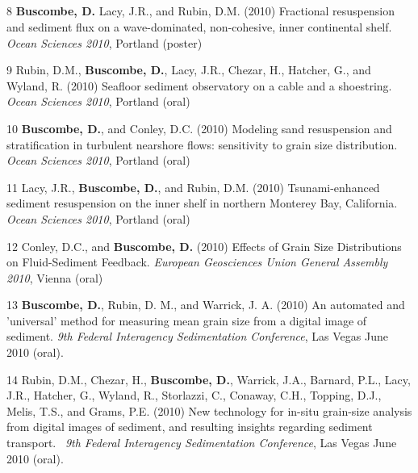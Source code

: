 \documentclass[margin,line]{resume}
\begin{document}
\begin{resume}
\begin{footnotesize}
	\subsection{}
	\begin{list1}
	\item[8] {\bf Buscombe, D.} Lacy, J.R., and Rubin, D.M. (2010) Fractional resuspension and sediment flux on a wave-dominated, non-cohesive, inner continental shelf. {\sl Ocean Sciences 2010}, Portland (poster)\\

	\item[9] Rubin, D.M., {\bf Buscombe, D.}, Lacy, J.R., Chezar, H., Hatcher, G., and Wyland, R. (2010) Seafloor sediment observatory on a cable and a shoestring. {\sl Ocean Sciences 2010}, Portland (oral)\\

	\item[10] {\bf Buscombe, D.}, and Conley, D.C. (2010) Modeling sand resuspension and stratification in turbulent nearshore flows: sensitivity to grain size distribution. {\sl Ocean Sciences 2010}, Portland (oral)\\

	\item[11] Lacy, J.R., {\bf Buscombe, D.}, and Rubin, D.M. (2010) Tsunami-enhanced sediment resuspension on the inner shelf in northern Monterey Bay, California. {\sl Ocean Sciences 2010}, Portland (oral)\\

	\item[12] Conley, D.C., and {\bf Buscombe, D.} (2010) Effects of Grain Size Distributions on Fluid-Sediment Feedback. {\sl European Geosciences Union General Assembly 2010}, Vienna (oral)\\

	\item[13] {\bf Buscombe, D.}, Rubin, D. M., and Warrick, J. A. (2010) An automated and 'universal' method for measuring mean grain size from a digital image of sediment. {\sl 9th Federal Interagency Sedimentation Conference}, Las Vegas June 2010 (oral).\\

	\item[14] Rubin, D.M., Chezar, H., {\bf Buscombe, D.}, Warrick, J.A., Barnard, P.L., Lacy, J.R., Hatcher, G., Wyland, R., Storlazzi, C., Conaway, C.H., Topping, D.J., Melis, T.S., and Grams, P.E. (2010) New technology for in-situ grain-size analysis from digital images of sediment, and resulting insights regarding sediment transport.  {\sl 9th Federal Interagency Sedimentation Conference}, Las Vegas June 2010 (oral).\\


\end{list1}
\end{footnotesize}
\end{resume}
\end{document}
